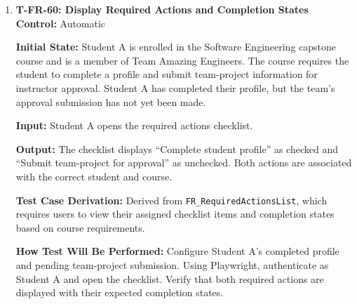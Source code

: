 \documentclass[12pt, titlepage]{article}
\begin{document}
\begin{enumerate}
\textbf{Input:} TA A edits the FAQ answer to ``Project proposals must include objectives, expected deliverables, and required skills'' and saves the updated resource.

\textbf{Output:} The updated FAQ is saved under the same course resource. Authorized students and supervisors see the revised answer when accessing it. The previous answer is no longer displayed as the current content.

\textbf{Test Case Derivation:} Derived from \texttt{FR\_ReferenceMaterial}, which requires course staff to maintain and edit existing resources. The test verifies that an authorized TA can update published material and that the updated version is accessible.

\textbf{How Test Will Be Performed:} Configure the published FAQ. Using Playwright, authenticate as TA A, edit the answer, and save. Retrieve the resource as an enrolled student and as an authorized external supervisor. Verify the revised content and confirm that only one current FAQ record is displayed.

\item \label{T-FR-60}\textbf{T-FR-60: Display Required Actions and Completion States}\\

\textbf{Control:} Automatic

\textbf{Initial State:} Student A is enrolled in the Software Engineering capstone course and is a member of Team Amazing Engineers. The course requires the student to complete a profile and submit team-project information for instructor approval. Student A has completed their profile, but the team's approval submission has not yet been made.

\textbf{Input:} Student A opens the required actions checklist.

\textbf{Output:} The checklist displays ``Complete student profile'' as checked and ``Submit team-project for approval'' as unchecked. Both actions are associated with the correct student and course.

\textbf{Test Case Derivation:} Derived from \texttt{FR\_RequiredActionsList}, which requires users to view their assigned checklist items and completion states based on course requirements.

\textbf{How Test Will Be Performed:} Configure Student A's completed profile and pending team-project submission. Using Playwright, authenticate as Student A and open the checklist. Verify that both required actions are displayed with their expected completion states.


\end{enumerate}
\end{document}
